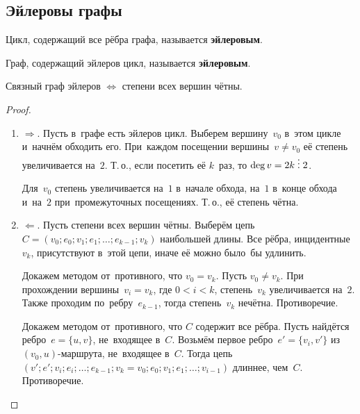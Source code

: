 \subsection{Эйлеровы графы}
Цикл, содержащий все рёбра графа, называется \textbf{эйлеровым}.

Граф, содержащий эйлеров цикл, называется \textbf{эйлеровым}.

\begin{theorem}
Связный граф эйлеров $\Leftrightarrow$ степени всех вершин чётны.
\end{theorem}
\begin{proof}
\begin{enumerate}
	\item $\Rightarrow$. Пусть в~графе есть эйлеров цикл.
	Выберем вершину~$v_0$ в~этом цикле и~начнём обходить его.
	При~каждом посещении вершины~$v \neq v_0$ её степень увеличивается на~$2$.
	Т.\,о., если посетить её $k$~раз, то $\deg v = 2k \;\vdots\; 2$.
	
	Для~$v_0$ степень увеличивается на~$1$ в~начале обхода, на~$1$ в~конце обхода и~на~$2$ при~промежуточных посещениях.
	Т.\,о., её степень чётна.
	
	\item $\Leftarrow$. Пусть степени всех вершин чётны.
	Выберём цепь~$C = (v_0; e_0; v_1; e_1; \ldots; e_{k-1}; v_k)$ наибольшей длины.
	Все рёбра, инцидентные~$v_k$, присутствуют в~этой цепи, иначе её можно было~бы удлинить.
	
	Докажем методом от~противного, что $v_0 = v_k$.
	Пусть $v_0 \neq v_k$.
	При прохождении вершины~$v_i = v_k$, где $0 < i < k$, степень~$v_k$ увеличивается на~$2$.
	Также проходим по~ребру~$e_{k-1}$, тогда степень~$v_k$ нечётна.
	Противоречие.
	
	Докажем методом от~противного, что $C$ содержит все рёбра.	
	Пусть найдётся ребро~$e = \{ u, v \}$, не~входящее в~$C$.
	Возьмём первое ребро~$e' = \{ v_i, v' \}$ из~$(v_0, u)$\nobreakdash-\hspace{0pt}маршрута, не~входящее в~$C$.
	Тогда цепь~$(v'; e'; v_i; e_i; \ldots; e_{k-1}; v_k = v_0; e_0; v_1; e_1; \ldots; v_{i-1})$ длиннее, чем~$C$.
	Противоречие.
\end{enumerate}
\end{proof}


